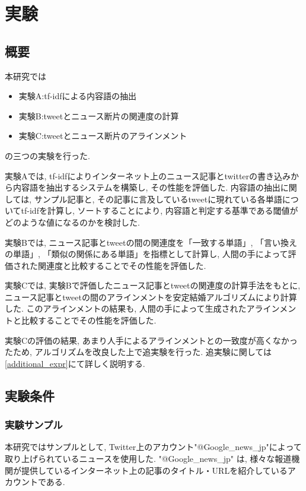 \documentclass[12pt]{jarticle}
\begin{document}

\section{実験}
\def\googlenews{Google\_news\_jp}
\subsection{概要}

本研究では
\begin{itemize}
\item 実験A:tf-idfによる内容語の抽出
\item 実験B:tweetとニュース断片の関連度の計算
\item 実験C:tweetとニュース断片のアラインメント
\end{itemize}
の三つの実験を行った. 

実験Aでは, tf-idfによりインターネット上のニュース記事とtwitterの書き込みから内容語を抽出するシステムを構築し, その性能を評価した. 
内容語の抽出に関しては, サンプル記事と, その記事に言及しているtweetに現れている各単語についてtf-idfを計算し, ソートすることにより, 内容語と判定する基準である閾値がどのような値になるのかを検討した. 

実験Bでは, ニュース記事とtweetの間の関連度を「一致する単語」, 「言い換えの単語」, 「類似の関係にある単語」を指標として計算し, 人間の手によって評価された関連度と比較することでその性能を評価した. 

実験Cでは, 実験Bで評価したニュース記事とtweetの関連度の計算手法をもとに, ニュース記事とtweetの間のアラインメントを安定結婚アルゴリズムにより計算した. 
このアラインメントの結果も, 人間の手によって生成されたアラインメントと比較することでその性能を評価した. 

実験Cの評価の結果, あまり人手によるアラインメントとの一致度が高くなかったため, アルゴリズムを改良した上で追実験を行った. 追実験に関しては\ref{additional_expr}にて詳しく説明する. 

\subsection{実験条件}
\subsubsection{実験サンプル}
本研究ではサンプルとして, Twitter上のアカウント"@\googlenews "によって取り上げられているニュースを使用した. 
"@\googlenews" は, 様々な報道機関が提供しているインターネット上の記事のタイトル・URLを紹介しているアカウントである. 
\end{document}
